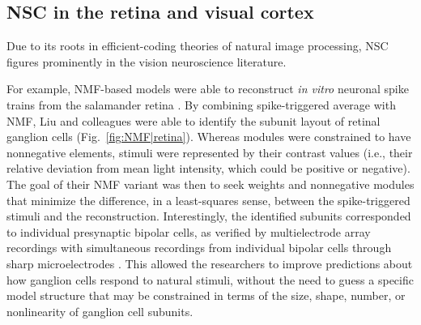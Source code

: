 \subsection*{NSC in the retina and visual cortex}

Due to its roots in efficient-coding theories of natural image processing,
\ac{NSC} figures prominently in the vision neuroscience literature.

For example, \ac{NMF}-based models were able to reconstruct
\emph{in vitro} neuronal spike trains from the salamander retina 
\cite{Onken2016,Liu2017}.
By combining spike-triggered average with \ac{NMF},
Liu and colleagues \cite{Liu2017} were able to identify the subunit layout
of retinal ganglion cells
(Fig.~\ref{fig:NMF|retina}). 
Whereas modules were constrained to have nonnegative elements,
stimuli were represented by their contrast values (i.e., their relative deviation from mean light intensity, which could be positive or negative).
The goal of their \ac{NMF} variant was then to seek weights and nonnegative modules
that minimize the difference, in a least-squares sense, between the spike-triggered
stimuli and the reconstruction.
Interestingly, the identified subunits corresponded to 
individual presynaptic bipolar cells,
as verified by multielectrode array recordings with simultaneous recordings from
individual bipolar cells through sharp microelectrodes \cite{Liu2017}.
This allowed the researchers to improve predictions about how ganglion cells respond
to natural stimuli, without the need to guess a specific model structure that may be constrained in terms of the size, shape, number, or nonlinearity of 
ganglion cell subunits.

